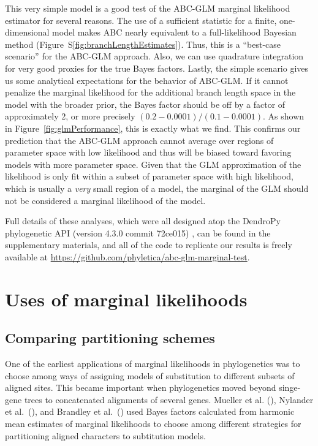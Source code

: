 This very simple model is a good test of the ABC-GLM marginal likelihood
estimator for several reasons.
The use of a sufficient statistic for a finite, one-dimensional model makes ABC
nearly equivalent to a full-likelihood Bayesian method
(Figure~S\ref{fig:branchLengthEstimates}).
Thus, this is a ``best-case scenario'' for the ABC-GLM approach.
Also, we can use quadrature integration for very good proxies for the true
Bayes factors.
Lastly, the simple scenario gives us some analytical expectations for the
behavior of ABC-GLM.
If it cannot penalize the marginal likelihood for the additional branch length
space in the model with the broader prior, the Bayes factor should be off by a
factor of approximately 2, or more precisely $(0.2-0.0001) / (0.1-0.0001)$.
As shown in Figure~\ref{fig:glmPerformance}, this is exactly what we find.
This confirms our prediction that the ABC-GLM approach cannot average over
regions of parameter space with low likelihood and thus will be biased toward
favoring models with more parameter space.
Given that the GLM approximation of the likelihood is only fit within a subset
of parameter space with high likelihood, which is usually a \emph{very} small
region of a model, the marginal of the GLM should not be considered a marginal
likelihood of the model.

Full details of these analyses, which were all designed atop the DendroPy
phylogenetic API (version 4.3.0 commit 72ce015) \citep{Sukumaran2010}, can be
found in the supplementary materials, and all of the code to replicate our
results is freely available at
\href{https://github.com/phyletica/abc-glm-marginal-test}{https://github.com/phyletica/abc-glm-marginal-test}.


\section{Uses of marginal likelihoods}


\subsection{Comparing partitioning schemes}

One of the earliest applications of marginal likelihoods in phylogenetics was
to choose among ways of assigning models of substitution to different subsets
of aligned sites.
This became important when phylogenetics moved beyond singe-gene trees to
concatenated alignments of several genes.
Mueller et al. (\citeyear{Mueller2004}),
Nylander et al.\ (\citeyear{NylanderEtal2004}), and
Brandley et al.\ (\citeyear{Brandley2005})
used Bayes factors calculated from harmonic mean
estimates of marginal likelihoods to choose among different strategies for
partitioning aligned characters to subtitution models.

